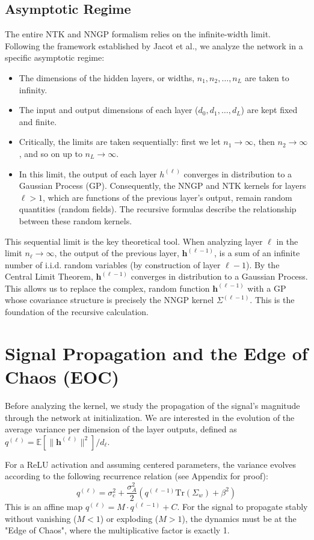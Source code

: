 \documentclass[12pt]{article}
\begin{document}
\subsection{Asymptotic Regime}
The entire NTK and NNGP formalism relies on the infinite-width limit. Following the framework established by Jacot et al., we analyze the network in a specific asymptotic regime:
\begin{itemize}
    \item The dimensions of the hidden layers, or widths, $n_1, n_2, \dots, n_L$ are taken to infinity.
    \item The input and output dimensions of each layer ($d_0, d_1, \dots, d_L$) are kept fixed and finite.
    \item Critically, the limits are taken sequentially: first we let $n_1 \to \infty$, then $n_2 \to \infty$, and so on up to $n_L \to \infty$.
    \item In this limit, the output of each layer $h^{(\ell)}$ converges in distribution to a Gaussian Process (GP). Consequently, the NNGP and NTK kernels for layers $\ell > 1$, which are functions of the previous layer's output, remain random quantities (random fields). The recursive formulas describe the relationship between these random kernels.
\end{itemize}
This sequential limit is the key theoretical tool. When analyzing layer $\ell$ in the limit $n_\ell \to \infty$, the output of the previous layer, $\bm{h}^{(\ell-1)}$, is a sum of an infinite number of i.i.d. random variables (by construction of layer $\ell-1$). By the Central Limit Theorem, $\bm{h}^{(\ell-1)}$ converges in distribution to a Gaussian Process. This allows us to replace the complex, random function $\bm{h}^{(\ell-1)}$ with a GP whose covariance structure is precisely the NNGP kernel $\Sigma^{(\ell-1)}$. This is the foundation of the recursive calculation.

\section{Signal Propagation and the Edge of Chaos (EOC)}
Before analyzing the kernel, we study the propagation of the signal's magnitude through the network at initialization. We are interested in the evolution of the average variance per dimension of the layer outputs, defined as $q^{(\ell)} = \mathbb{E}[\|\bm{h}^{(\ell)}\|^2]/d_\ell$.

For a ReLU activation and assuming centered parameters, the variance evolves according to the following recurrence relation (see Appendix for proof):
\begin{equation}
    q^{(\ell)} = \sigma_c^2 + \frac{\sigma_A^2}{2} \left( q^{(\ell-1)}\text{Tr}(\Sigma_w) + \beta^2 \right)
\end{equation}
This is an affine map $q^{(\ell)} = M \cdot q^{(\ell-1)} + C$. For the signal to propagate stably without vanishing ($M<1$) or exploding ($M>1$), the dynamics must be at the "Edge of Chaos", where the multiplicative factor is exactly 1.
\end{document}
